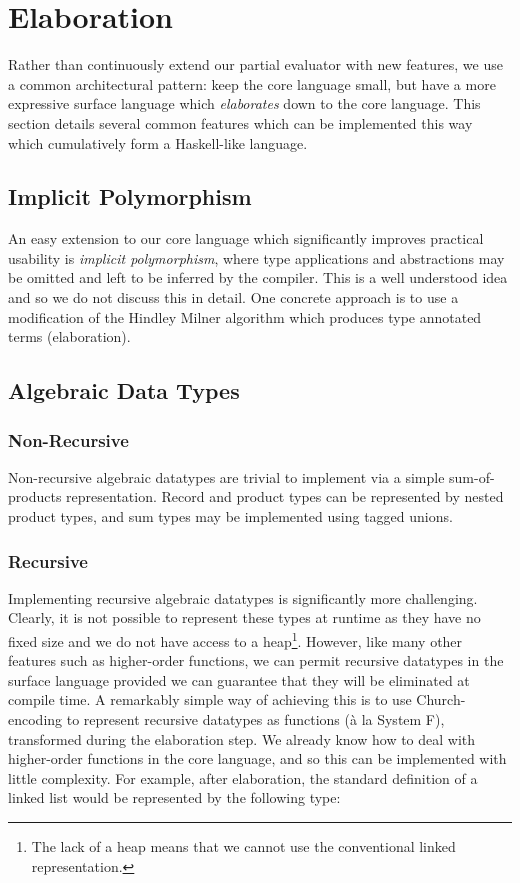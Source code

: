 \documentclass[runningheads]{llncs}
\begin{document}
\section{Elaboration} \label{sec:elaboration}

Rather than continuously extend our partial evaluator with new features, we use a common architectural pattern: keep the core language small, but have a more expressive surface language which \emph{elaborates} down to the core language. This section details several common features which can be implemented this way which cumulatively form a Haskell-like language.

\subsection{Implicit Polymorphism}

An easy extension to our core language which significantly improves practical usability is \emph{implicit polymorphism}, where type applications and abstractions may be omitted and left to be inferred by the compiler. This is a well understood idea and so we do not discuss this in detail. One concrete approach is to use a modification of the Hindley Milner algorithm \cite{milner1978theory} which produces type annotated terms (elaboration).

\subsection{Algebraic Data Types}

\subsubsection{Non-Recursive}

Non-recursive algebraic datatypes are trivial to implement via a simple sum-of-products representation. Record and product types can be represented by nested product types, and sum types may be implemented using tagged unions.

\subsubsection{Recursive}

Implementing recursive algebraic datatypes is significantly more challenging. Clearly, it is not possible to represent these types at runtime as they have no fixed size and we do not have access to a heap\footnote{The lack of a heap means that we cannot use the conventional linked representation.}. However, like many other features such as higher-order functions, we can permit recursive datatypes in the surface language provided we can guarantee that they will be eliminated at compile time. A remarkably simple way of achieving this is to use Church-encoding to represent recursive datatypes as functions (à la System F), transformed during the elaboration step. We already know how to deal with higher-order functions in the core language, and so this can be implemented with little complexity. For example, after elaboration, the standard definition of a linked list would be represented by the following type:
\end{document}

